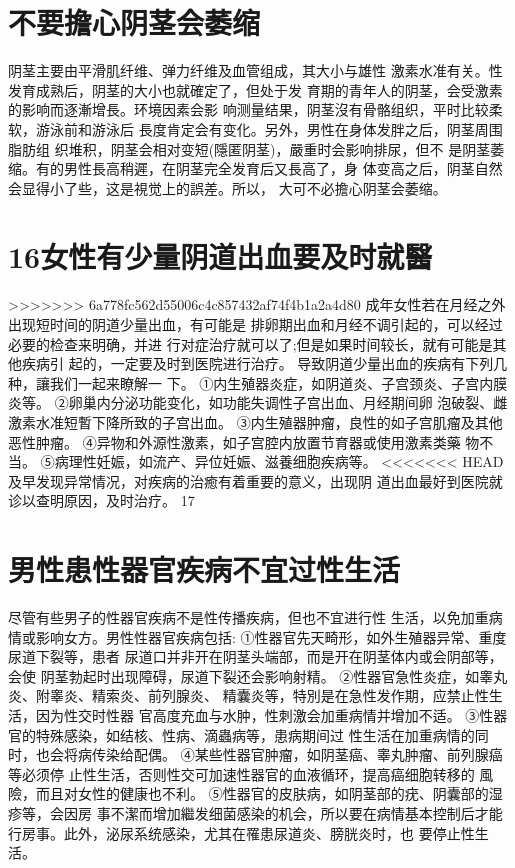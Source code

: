 \documentclass[12pt,UTF8]{ctexbook}
\begin{document}
\section{不要擔心阴茎会萎缩}
阴茎主要由平滑肌纤维、弹力纤维及血管组成，其大小与雄性
激素水准有关。性发育成熟后，阴茎的大小也就確定了，但处于发
育期的青年人的阴茎，会受激素的影响而逐漸增長。环境因素会影
响测量结果，阴茎沒有骨骼组织，平时比较柔软，游泳前和游泳后
長度肯定会有变化。另外，男性在身体发胖之后，阴茎周围脂肪组
织堆积，阴茎会相对变短(隱匿阴茎)，嚴重时会影响排尿，但不
是阴茎萎缩。有的男性長高稍遲，在阴茎完全发育后又長高了，身
体变高之后，阴茎自然会显得小了些，这是視觉上的誤差。所以，
大可不必擔心阴茎会萎缩。
\section{16女性有少量阴道出血要及时就醫}
>>>>>>> 6a778fc562d55006c4c857432af74f4b1a2a4d80
成年女性若在月经之外出现短时间的阴道少量出血，有可能是
排卵期出血和月经不调引起的，可以经过必要的检查来明确，并进
行对症治疗就可以了;但是如果时间较长，就有可能是其他疾病引
起的，一定要及时到医院进行治疗。
导致阴道少量出血的疾病有下列几种，讓我们一起来瞭解一
下。
①内生殖器炎症，如阴道炎、子宫颈炎、子宫内膜炎等。
②卵巢内分泌功能变化，如功能失调性子宫出血、月经期间卵
泡破裂、雌激素水准短暫下降所致的子宫出血。
③内生殖器肿瘤，良性的如子宫肌瘤及其他恶性肿瘤。
④异物和外源性激素，如子宫腔内放置节育器或使用激素类藥
物不当。
⑤病理性妊娠，如流产、异位妊娠、滋養细胞疾病等。
<<<<<<< HEAD
及早发现异常情况，对疾病的治癒有着重要的意义，出现阴
道出血最好到医院就诊以查明原因，及时治疗。
17
\section{男性患性器官疾病不宜过性生活}
尽管有些男子的性器官疾病不是性传播疾病，但也不宜进行性
生活，以免加重病情或影响女方。男性性器官疾病包括:
①性器官先天畸形，如外生殖器异常、重度尿道下裂等，患者
尿道口并非开在阴茎头端部，而是开在阴茎体内或会阴部等，会使
阴茎勃起时出现障碍，尿道下裂还会影响射精。
②性器官急性炎症，如睾丸炎、附睾炎、精索炎、前列腺炎、
精囊炎等，特別是在急性发作期，应禁止性生活，因为性交时性器
官高度充血与水肿，性刺激会加重病情并增加不适。
③性器官的特殊感染，如结核、性病、滴蟲病等，患病期间过
性生活在加重病情的同时，也会将病传染给配偶。
④某些性器官肿瘤，如阴茎癌、睾丸肿瘤、前列腺癌等必须停
止性生活，否则性交可加速性器官的血液循环，提高癌细胞转移的
風險，而且对女性的健康也不利。
⑤性器官的皮肤病，如阴茎部的疣、阴囊部的湿疹等，会因房
事不潔而增加繼发细菌感染的机会，所以要在病情基本控制后才能
行房事。此外，泌尿系统感染，尤其在罹患尿道炎、膀胱炎时，也
要停止性生活。
\end{document}
